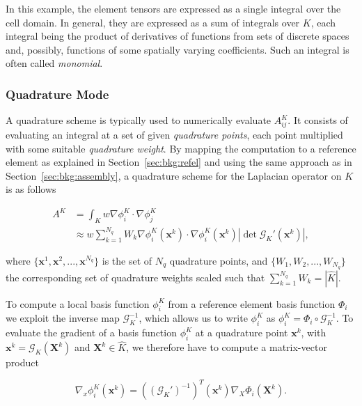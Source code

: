 In this example, the element tensors are expressed as a single integral over the cell domain. In general, they are expressed as a sum of integrals over $K$, each integral being the product of derivatives of functions from sets of discrete spaces and, possibly, functions of some spatially varying coefficients. Such an integral is often called \textit{monomial}. 

\subsubsection{Quadrature Mode}
A quadrature scheme is typically used to numerically evaluate $A_{ij}^K$. It consists of evaluating an integral at a set of given {\em quadrature points}, each point multiplied with some suitable {\em quadrature weight}. By mapping the computation to a reference element as explained in Section~\ref{sec:bkg:refel} and using the same approach as in Section~\ref{sec:bkg:assembly}, a quadrature scheme for the Laplacian operator on $K$ is as follows

\begin{equation}
\begin{split}
A^K & = \int_K w \nabla \phi_i^K \cdot \nabla \phi_j^K \\
& \approx w \sum_{k=1}^{N_q} W_k \nabla \phi_i^K(\boldsymbol{x}^k) \cdot \nabla \phi_i^K (\boldsymbol{x}^k) | \operatorname{det} \mathcal{G}_K'(\boldsymbol{x}^k) |,
\end{split}
\end{equation} 

where $\lbrace \boldsymbol{x}^1, \boldsymbol{x}^2, ..., \boldsymbol{x}^{N_q} \rbrace$ is the set of $N_q$ quadrature points, and $\lbrace W_1, W_2, ..., W_{N_q} \rbrace$ the corresponding set of quadrature weights scaled such that $\sum_{k=1}^{N_q} W_k = |\hat{K}|$. 

To compute a local basis function $\phi_i^K$ from a reference element basis function $\Phi_i$ we exploit the inverse map $\mathcal{G}_K^{-1}$, which allows us to write $\phi_i^K$ as $\phi_i^K = \Phi_i \circ \mathcal{G}_K^{-1}$. To evaluate the gradient of a basis function $\phi_i^K$ at a quadrature point $\boldsymbol{x}^k$, with $\boldsymbol{x}^k = \mathcal{G}_K(\boldsymbol{X}^k)$ and $\boldsymbol{X}^k \in \hat{K}$, we therefore have to compute a matrix-vector product

\begin{equation}
\nabla_x \phi_i^K(\boldsymbol{x}^k) = ((\mathcal{G}_K')^{-1})^{T}(\boldsymbol{x}^k) \nabla_X \Phi_i(\boldsymbol{X}^k).
\end{equation}

